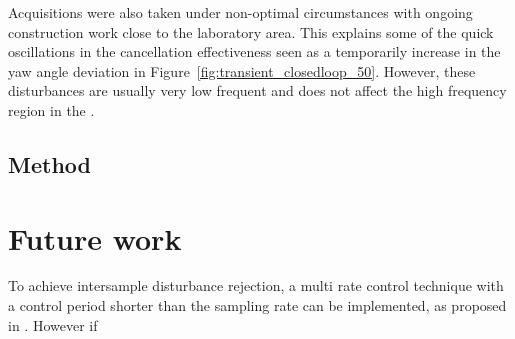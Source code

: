 Acquisitions were also taken under non-optimal circumstances with ongoing construction work close to the laboratory area. This explains some of the quick oscillations in the cancellation effectiveness seen as a temporarily increase in the yaw angle deviation in Figure~\ref{fig:transient_closedloop_50}. However, these disturbances are usually very low frequent and does not affect the high frequency region in the \abbrFFT.

\subsection{Method}


\section{Future work}

To achieve intersample disturbance rejection, a multi rate control technique with a control period shorter than the sampling rate can be implemented, as proposed in \citep{fujimoto2009rro}. However if
